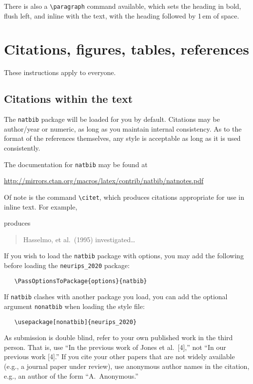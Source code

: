 \documentclass{article}
\begin{document}
There is also a \verb+\paragraph+ command available, which sets the heading in
bold, flush left, and inline with the text, with the heading followed by 1\,em
of space.

\section{Citations, figures, tables, references}
\label{others}

These instructions apply to everyone.

\subsection{Citations within the text}

The \verb+natbib+ package will be loaded for you by default.  Citations may be
author/year or numeric, as long as you maintain internal consistency.  As to the
format of the references themselves, any style is acceptable as long as it is
used consistently.

The documentation for \verb+natbib+ may be found at
\begin{center}
  \url{http://mirrors.ctan.org/macros/latex/contrib/natbib/natnotes.pdf}
\end{center}
Of note is the command \verb+\citet+, which produces citations appropriate for
use in inline text.  For example,

produces
\begin{quote}
  Hasselmo, et al.\ (1995) investigated\dots
\end{quote}

If you wish to load the \verb+natbib+ package with options, you may add the
following before loading the \verb+neurips_2020+ package:
\begin{verbatim}
   \PassOptionsToPackage{options}{natbib}
\end{verbatim}

If \verb+natbib+ clashes with another package you load, you can add the optional
argument \verb+nonatbib+ when loading the style file:
\begin{verbatim}
   \usepackage[nonatbib]{neurips_2020}
\end{verbatim}

As submission is double blind, refer to your own published work in the third
person. That is, use ``In the previous work of Jones et al.\ [4],'' not ``In our
previous work [4].'' If you cite your other papers that are not widely available
(e.g., a journal paper under review), use anonymous author names in the
citation, e.g., an author of the form ``A.\ Anonymous.''
\end{document}
